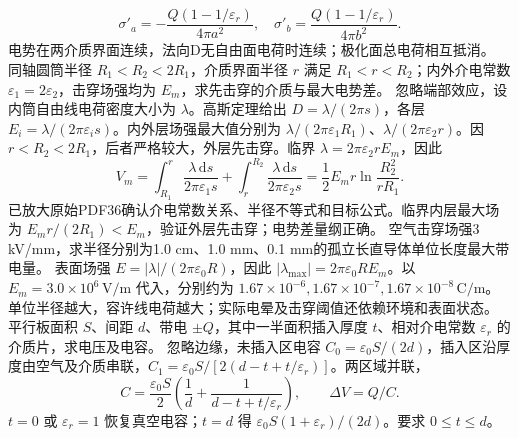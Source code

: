 \[
\sigma'_a=-\frac{Q(1-1/\varepsilon_r)}{4\pi a^2},\quad
\sigma'_b=\frac{Q(1-1/\varepsilon_r)}{4\pi b^2}.
\]
\crosscheck 电势在两介质界面连续，法向D无自由面电荷时连续；极化面总电荷相互抵消。
\problemtext 同轴圆筒半径 $R_1<R_2<2R_1$，介质界面半径 $r$ 满足 $R_1<r<R_2$；内外介电常数 $\varepsilon_1=2\varepsilon_2$，击穿场强均为 $E_m$，求先击穿的介质与最大电势差。
\workings 忽略端部效应，设内筒自由线电荷密度大小为 $\lambda$。高斯定理给出 $D=\lambda/(2\pi s)$，各层 $E_i=\lambda/(2\pi\varepsilon_i s)$。内外层场强最大值分别为 $\lambda/(2\pi\varepsilon_1 R_1)$、$\lambda/(2\pi\varepsilon_2 r)$。因 $r<R_2<2R_1$，后者严格较大，外层先击穿。临界 $\lambda=2\pi\varepsilon_2r E_m$，因此
\[
V_m=\int_{R_1}^r \frac{\lambda\,\mathrm ds}{2\pi\varepsilon_1s}
+\int_r^{R_2}\frac{\lambda\,\mathrm ds}{2\pi\varepsilon_2s}
=\frac12 E_mr\ln\frac{R_2^2}{rR_1}.
\]
\crosscheck 已放大原始PDF36确认介电常数关系、半径不等式和目标公式。临界内层最大场为 $E_mr/(2R_1)<E_m$，验证外层先击穿；电势差量纲正确。
\problemtext 空气击穿场强3 kV/mm，求半径分别为1.0 cm、1.0 mm、0.1 mm的孤立长直导体单位长度最大带电量。
\workings 表面场强 $E=|\lambda|/(2\pi\varepsilon_0R)$，因此 $|\lambda_{\max}|=2\pi\varepsilon_0RE_m$。以 $E_m=3.0\times10^6\,\mathrm{V/m}$ 代入，分别约为 $1.67\times10^{-6},1.67\times10^{-7},1.67\times10^{-8}\,\mathrm{C/m}$。
\crosscheck 单位半径越大，容许线电荷越大；实际电晕及击穿阈值还依赖环境和表面状态。
\problemtext 平行板面积 $S$、间距 $d$、带电 $\pm Q$，其中一半面积插入厚度 $t$、相对介电常数 $\varepsilon_r$ 的介质片，求电压及电容。
\workings 忽略边缘，未插入区电容 $C_0=\varepsilon_0S/(2d)$，插入区沿厚度由空气及介质串联，$C_1=\varepsilon_0S/[2(d-t+t/\varepsilon_r)]$。两区域并联，
\[
C=\frac{\varepsilon_0 S}{2}\left(\frac1d+\frac1{d-t+t/\varepsilon_r}\right),\qquad
\Delta V=Q/C.
\]
\crosscheck $t=0$ 或 $\varepsilon_r=1$ 恢复真空电容；$t=d$ 得 $\varepsilon_0S(1+\varepsilon_r)/(2d)$。要求 $0\le t\le d$。

